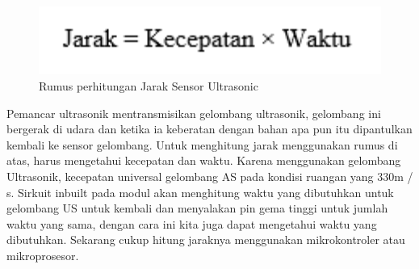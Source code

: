 \begin{enumerate}
\begin{figure}[H]
\centering
\includegraphics[width=1\textwidth]{figures/rumus.png}
\caption{Rumus perhitungan Jarak Sensor Ultrasonic}
\label{print}
\end{figure}

\par Pemancar ultrasonik mentransmisikan gelombang ultrasonik, gelombang ini bergerak di udara dan ketika ia keberatan dengan bahan apa pun itu dipantulkan kembali ke sensor gelombang. Untuk menghitung jarak menggunakan rumus di atas, harus mengetahui kecepatan dan waktu. Karena menggunakan gelombang Ultrasonik, kecepatan universal gelombang AS pada kondisi ruangan yang 330m / s. Sirkuit inbuilt pada modul akan menghitung waktu yang dibutuhkan untuk gelombang US untuk kembali dan menyalakan pin gema tinggi untuk jumlah waktu yang sama, dengan cara ini kita juga dapat mengetahui waktu yang dibutuhkan. Sekarang cukup hitung jaraknya menggunakan mikrokontroler atau mikroprosesor.


\end{enumerate}
